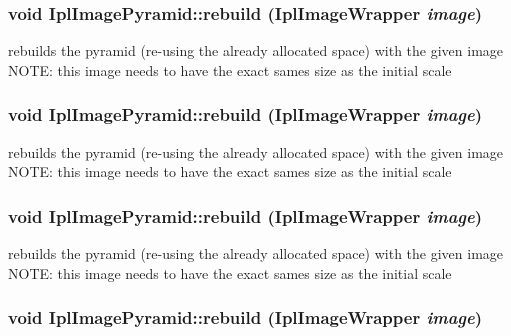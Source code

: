 \hypertarget{class_ipl_image_pyramid_a24f697b2da922a8240aa9f24af476d5e}{
\subsubsection[{rebuild}]{\setlength{\rightskip}{0pt plus 5cm}void IplImagePyramid::rebuild ({\bf IplImageWrapper} {\em image})}}
\label{class_ipl_image_pyramid_a24f697b2da922a8240aa9f24af476d5e}
rebuilds the pyramid (re-\/using the already allocated space) with the given image NOTE: this image needs to have the exact sames size as the initial scale \hypertarget{class_ipl_image_pyramid_a24f697b2da922a8240aa9f24af476d5e}{
\subsubsection[{rebuild}]{\setlength{\rightskip}{0pt plus 5cm}void IplImagePyramid::rebuild ({\bf IplImageWrapper} {\em image})}}
\label{class_ipl_image_pyramid_a24f697b2da922a8240aa9f24af476d5e}
rebuilds the pyramid (re-\/using the already allocated space) with the given image NOTE: this image needs to have the exact sames size as the initial scale \hypertarget{class_ipl_image_pyramid_a24f697b2da922a8240aa9f24af476d5e}{
\subsubsection[{rebuild}]{\setlength{\rightskip}{0pt plus 5cm}void IplImagePyramid::rebuild ({\bf IplImageWrapper} {\em image})}}
\label{class_ipl_image_pyramid_a24f697b2da922a8240aa9f24af476d5e}
rebuilds the pyramid (re-\/using the already allocated space) with the given image NOTE: this image needs to have the exact sames size as the initial scale \hypertarget{class_ipl_image_pyramid_a24f697b2da922a8240aa9f24af476d5e}{
\subsubsection[{rebuild}]{\setlength{\rightskip}{0pt plus 5cm}void IplImagePyramid::rebuild ({\bf IplImageWrapper} {\em image})}}
\label{class_ipl_image_pyramid_a24f697b2da922a8240aa9f24af476d5e}
